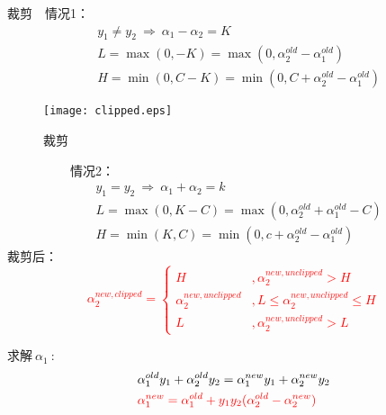 裁剪~~情况1：
\begin{align}
    &y_1\neq y_2 ~\Rightarrow~\alpha_1-\alpha_2 = K   \nonumber \\
    &L=\max(0,-K)=\max(0,\alpha_2^{old}-\alpha_1^{old}) \nonumber\\
    &H=\min(0,C-K)=\min(0,C+\alpha_2^{old}-\alpha_1^{old}) \nonumber
\end{align}
\begin{figure}[!htb]
  \centering
  \texttt{[image: clipped.eps]}
  \caption{裁剪}
\end{figure}
\indent~~~~~~~~~~情况2：
\begin{align}
    &y_1= y_2 ~\Rightarrow~\alpha_1+\alpha_2 = k   \nonumber \\
    &L=\max(0,K-C)=\max(0,\alpha_2^{old}+\alpha_1^{old}-C) \nonumber\\
    &H=\min(K,C)=\min(0,c+\alpha_2^{old}-\alpha_1^{old}) \nonumber
\end{align}
\indent 裁剪后：
\textcolor{red}{\begin{equation}\nonumber
\alpha_2^{new,clipped}=
\begin{cases}
H& ,\alpha_2^{new,unclipped}>H\\
\alpha_2^{new,unclipped}&,L\leq \alpha_2^{new,unclipped}\leq H\\
L&,\alpha_2^{new,unclipped}>L
\end{cases}
\end{equation}}

求解$~\alpha_1~$:
\begin{align}
  &\alpha_1^{old}y_1+\alpha_2^{old}y_2=\alpha_1^{new}y_1+\alpha_2^{new}y_2 \nonumber\\
  &\textcolor{red}{\alpha_1^{new}=\alpha_1^{old}+y_1y_2(\alpha_2^{old}-\alpha_2^{new})}
\end{align}

